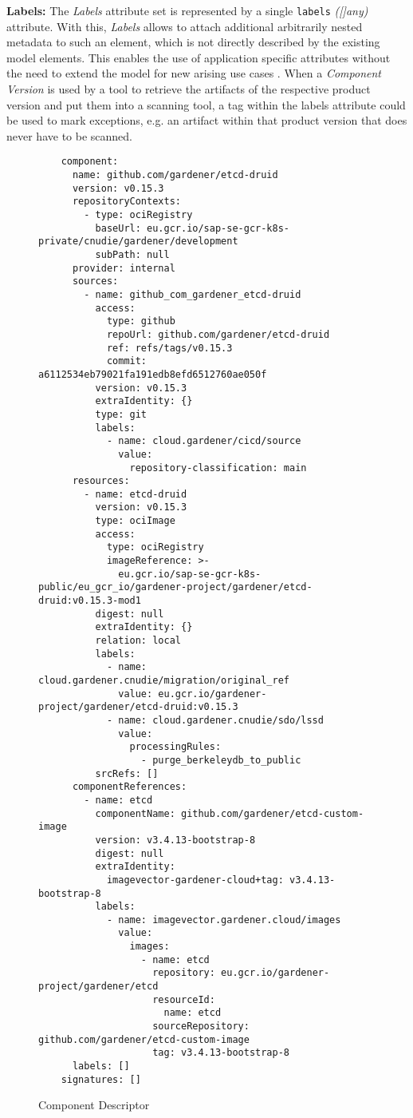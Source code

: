 \textbf{Labels:} The \emph{Labels} attribute set is represented by a single \lstinline|labels| \emph{([]any)} attribute. With this, \emph{Labels} allows to attach additional arbitrarily nested metadata to such an element, which is not directly described by the existing model elements. This enables the use of application specific attributes without the need to extend the model for new arising use cases \cite{OCMSpec}. When a \emph{Component Version} is used by a tool to retrieve the artifacts of the respective product version and put them into a scanning tool, a tag within the labels attribute could be used to mark exceptions, e.g. an artifact within that product version that does never have to be scanned.
\begin{figure}[H]
\begin{verbatim}
    component:
      name: github.com/gardener/etcd-druid
      version: v0.15.3
      repositoryContexts:
        - type: ociRegistry
          baseUrl: eu.gcr.io/sap-se-gcr-k8s-private/cnudie/gardener/development
          subPath: null
      provider: internal
      sources:
        - name: github_com_gardener_etcd-druid
          access:
            type: github
            repoUrl: github.com/gardener/etcd-druid
            ref: refs/tags/v0.15.3
            commit: a6112534eb79021fa191edb8efd6512760ae050f
          version: v0.15.3
          extraIdentity: {}
          type: git
          labels:
            - name: cloud.gardener/cicd/source
              value:
                repository-classification: main
      resources:
        - name: etcd-druid
          version: v0.15.3
          type: ociImage
          access:
            type: ociRegistry
            imageReference: >-
              eu.gcr.io/sap-se-gcr-k8s-public/eu_gcr_io/gardener-project/gardener/etcd-druid:v0.15.3-mod1
          digest: null
          extraIdentity: {}
          relation: local
          labels:
            - name: cloud.gardener.cnudie/migration/original_ref
              value: eu.gcr.io/gardener-project/gardener/etcd-druid:v0.15.3
            - name: cloud.gardener.cnudie/sdo/lssd
              value:
                processingRules:
                  - purge_berkeleydb_to_public
          srcRefs: []
      componentReferences:
        - name: etcd
          componentName: github.com/gardener/etcd-custom-image
          version: v3.4.13-bootstrap-8
          digest: null
          extraIdentity:
            imagevector-gardener-cloud+tag: v3.4.13-bootstrap-8
          labels:
            - name: imagevector.gardener.cloud/images
              value:
                images:
                  - name: etcd
                    repository: eu.gcr.io/gardener-project/gardener/etcd
                    resourceId:
                      name: etcd
                    sourceRepository: github.com/gardener/etcd-custom-image
                    tag: v3.4.13-bootstrap-8
      labels: []
    signatures: []
\end{verbatim}
	\centering
	\caption[Component Descriptor]{Component Descriptor }
	\label{fig:ComponentDescriptor}
\end{figure}

